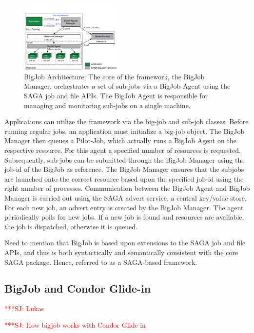 \documentclass[conference,final]{IEEEtran}
\newcommand{\jhanote}[1]{ {\textcolor{red} { ***SJ: #1 }}}
\newcommand{\jhanote}[1]{}
\begin{document}
\begin{figure}[ht]
    \centering
    \includegraphics[width=0.45\textwidth]{figures/bigjob}
   \caption{BigJob Architecture: The core of the framework, the
      BigJob Manager, orchestrates a set of sub-jobs via a
      BigJob Agent using the SAGA job and file APIs.  The
      BigJob Agent is responsible for managing and monitoring sub-jobs
      on a single machine.}
   \label{fig:figures_bigjob}
\end{figure}

Applications can utilize the framework via the big-job and
sub-job classes.  Before running regular jobs, an application
must initialize a big-job object.  The BigJob Manager then
queues a Pilot-Job, which actually runs a BigJob Agent on the
respective resource. For this agent a specified number of resources is
requested. Subsequently, sub-jobs can be submitted through the BigJob
Manager using the job-id of the BigJob as reference. The BigJob
Manager ensures that the subjobs are launched onto the correct
resource based upon the specified job-id using the right number of
processes. Communication between the BigJob Agent and BigJob Manager
is carried out using the SAGA advert service, a central key/value
store. For each new job, an advert entry is created by the BigJob
Manager. The agent periodically polls for new jobs. If a new job is
found and resources are available, the job is dispatched, otherwise it
is queued.

Need to mention that BigJob is based upon extensions to the SAGA job
and file APIs, and thus is both syntactically and semantically
consistent with the core SAGA package. Hence, referred to as a
SAGA-based framework.


\subsection{BigJob and Condor Glide-in} \jhanote{Lukas}


\jhanote{How bigjob works with Condor Glide-in}
\end{document}
